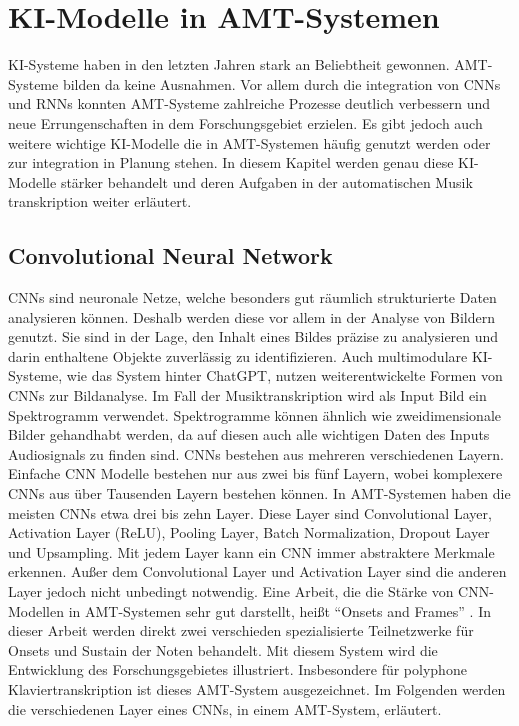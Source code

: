 \section{KI-Modelle in AMT-Systemen}
\label{sec:ki_integration}
KI-Systeme haben in den letzten Jahren stark an Beliebtheit gewonnen.
AMT-Systeme bilden da keine Ausnahmen.
Vor allem durch die integration von CNNs und RNNs konnten AMT-Systeme zahlreiche Prozesse deutlich verbessern
und neue Errungenschaften in dem Forschungsgebiet erzielen.
Es gibt jedoch auch weitere wichtige KI-Modelle die in AMT-Systemen häufig genutzt werden
oder zur integration in Planung stehen.
In diesem Kapitel werden genau diese KI-Modelle stärker behandelt
und deren Aufgaben in der automatischen Musik transkription weiter erläutert.

\subsection{Convolutional Neural Network}
CNNs sind neuronale Netze, welche besonders gut räumlich strukturierte Daten analysieren können.
Deshalb werden diese vor allem in der Analyse von Bildern genutzt.
Sie sind in der Lage, den Inhalt eines Bildes präzise zu analysieren und darin enthaltene Objekte zuverlässig zu identifizieren.
Auch multimodulare KI-Systeme, wie das System hinter ChatGPT, nutzen weiterentwickelte Formen von CNNs zur Bildanalyse.
Im Fall der Musiktranskription wird als Input Bild ein Spektrogramm verwendet.
Spektrogramme können ähnlich wie zweidimensionale Bilder gehandhabt werden,
da auf diesen auch alle wichtigen Daten des Inputs Audiosignals zu finden sind.
CNNs bestehen aus mehreren verschiedenen Layern.
Einfache CNN Modelle bestehen nur aus zwei bis fünf Layern,
wobei komplexere CNNs aus über Tausenden Layern bestehen können.
In AMT-Systemen haben die meisten CNNs etwa drei bis zehn Layer.
Diese Layer sind Convolutional Layer, Activation Layer (ReLU), Pooling Layer,
Batch Normalization, Dropout Layer und Upsampling.
Mit jedem Layer kann ein CNN immer abstraktere Merkmale erkennen.
Außer dem Convolutional Layer und Activation Layer sind die anderen Layer jedoch nicht unbedingt notwendig.
Eine Arbeit, die die Stärke von CNN-Modellen in AMT-Systemen sehr gut darstellt, heißt \enquote{Onsets and Frames} \cite{hawthorne2017onsets}.
In dieser Arbeit werden direkt zwei verschieden spezialisierte Teilnetzwerke für Onsets und Sustain der Noten behandelt.
Mit diesem System wird die Entwicklung des Forschungsgebietes illustriert.
Insbesondere für polyphone Klaviertranskription ist dieses AMT-System ausgezeichnet.
Im Folgenden werden die verschiedenen Layer eines CNNs, in einem AMT-System, erläutert.

